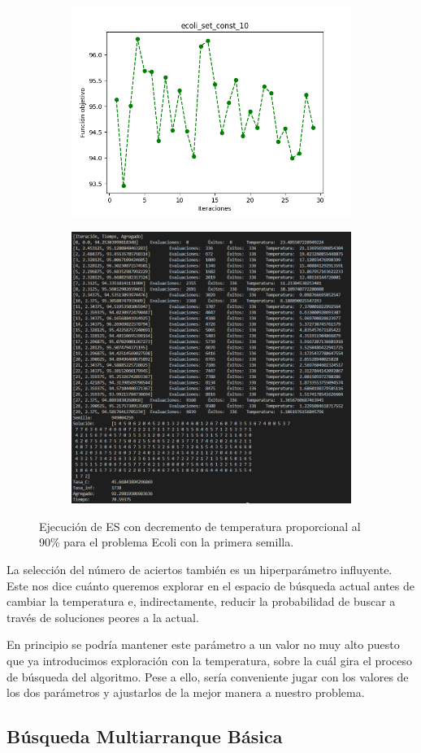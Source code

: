 \begin{figure}[H]
    \centering
    \begin{subfigure}
        \centering
        \includegraphics[width=0.4\linewidth]{img/es/cost.png}
        \vspace*{1mm}
    \end{subfigure}%
    \begin{subfigure}
        \centering
        \includegraphics[width=0.55\linewidth]{img/es/ejecucion.png}
    \end{subfigure}
    \caption{Ejecución de ES con decremento de temperatura proporcional al 90\% para el problema Ecoli con la primera semilla.}
    \label{temperatura}
\end{figure}

La selección del número de aciertos también es un hiperparámetro influyente. Este nos dice cuánto queremos explorar en el espacio de búsqueda actual antes de cambiar la temperatura e, indirectamente, reducir la probabilidad de buscar a través de soluciones peores a la actual.

En principio se podría mantener este parámetro a un valor no muy alto puesto que ya introducimos exploración con la temperatura, sobre la cuál gira el proceso de búsqueda del algoritmo. Pese a ello, sería conveniente jugar con los valores de los dos parámetros y ajustarlos de la mejor manera a nuestro problema.

\subsection{Búsqueda Multiarranque Básica}


